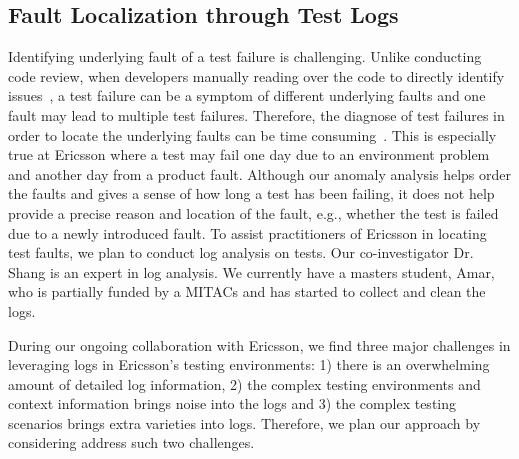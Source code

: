 \subsection{Fault Localization through Test Logs}

Identifying underlying fault of a test failure is challenging. Unlike conducting code review, when developers manually reading over the code to directly identify issues~\cite{}, a test failure can be a symptom of different underlying faults and one fault may lead to multiple test failures. Therefore, the diagnose of test failures in order to locate the underlying faults can be time consuming~\cite{}. This is especially true at Ericsson where a test may fail one day due to an environment problem and another day from a product fault. Although our anomaly analysis helps order the faults and gives a sense of how long a test has been failing, it does not help provide a precise reason and location of the fault, e.g., whether the test is failed due to a newly introduced fault. To assist practitioners of Ericsson in locating test faults, we plan to conduct log analysis on tests. Our co-investigator Dr. Shang is an expert in log analysis. We currently have a masters student, Amar, who is partially funded by a MITACs and has started to collect and clean the logs.

During our ongoing collaboration with Ericsson, we find three major challenges in leveraging logs in Ericsson's testing environments: 1) there is an overwhelming amount of detailed log information, 2) the complex testing environments and context information brings noise into the logs and 3) the complex testing scenarios brings extra varieties into logs. Therefore, we plan our approach by considering address such two challenges.

